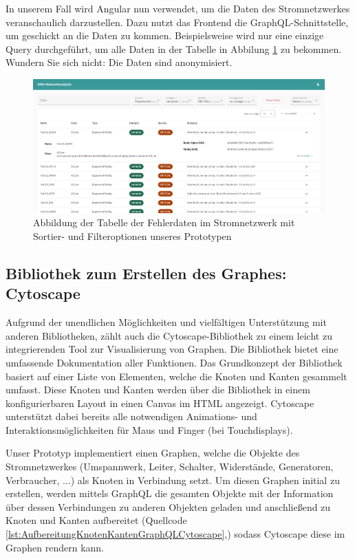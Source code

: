 In unserem Fall wird Angular nun verwendet, um die Daten des Stromnetzwerkes veranschaulich darzustellen. Dazu nutzt das Frontend die GraphQL-Schnittstelle, um geschickt an die Daten zu kommen. Beispielsweise wird nur eine einzige Query durchgeführt, um alle Daten in der Tabelle in Abbilung \ref{fig:PrototypTabelle} zu bekommen. Wundern Sie sich nicht: Die Daten sind anonymisiert.

\begin{figure}
    \centering
    \includegraphics[width=1\textwidth]{content/img/Empire/Frontend/Angular_Findings_Prototype.png}
    \caption{Abbildung der Tabelle der Fehlerdaten im Stromnetzwerk mit Sortier- und Filteroptionen unseres Prototypen}
    \label{fig:PrototypTabelle}
\end{figure}
\FloatBarrier

\newpage

\subsection{Bibliothek zum Erstellen des Graphes: Cytoscape}

Aufgrund der unendlichen Möglichkeiten und vielfältigen Unterstützung mit anderen Bibliotheken, zählt auch die Cytoscape-Bibliothek zu einem leicht zu integrierenden Tool zur Visualisierung von Graphen. Die Bibliothek bietet eine umfassende Dokumentation aller Funktionen. Das Grundkonzept der Bibliothek basiert auf einer Liste von Elementen, welche die Knoten und Kanten gesammelt umfasst. Diese Knoten und Kanten werden über die Bibliothek in einem konfigurierbaren Layout in einen Canvas im HTML angezeigt. Cytoscape unterstützt dabei bereits alle notwendigen Animations- und Interaktionsmöglichkeiten für Maus und Finger (bei Touchdisplays). \cite{Cytoscape}

Unser Prototyp implementiert einen Graphen, welche die Objekte des Stromnetzwerkes (Umspannwerk, Leiter, Schalter, Widerstände, Generatoren, Verbraucher, ...) als Knoten in Verbindung setzt. Um diesen Graphen initial zu erstellen, werden mittels GraphQL die gesamten Objekte mit der Information über dessen Verbindungen zu anderen Objekten geladen und anschließend zu Knoten und Kanten aufbereitet (Quellcode \ref{lst:AufbereitungKnotenKantenGraphQLCytoscape},) sodass Cytoscape diese im Graphen rendern kann.

